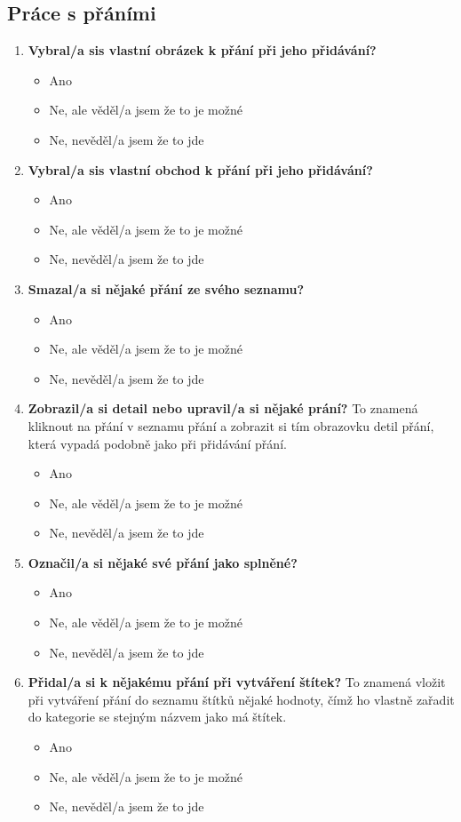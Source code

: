 \subsection{Práce s přáními}
\begin{enumerate}
\item \textbf{Vybral/a sis vlastní obrázek k přání při jeho přidávání?}
		\begin{itemize}
		\item Ano
		\item Ne, ale věděl/a jsem že to je možné
		\item Ne, nevěděl/a jsem že to jde
		\end{itemize}
\item \textbf{Vybral/a sis vlastní obchod k přání při jeho přidávání?}
		\begin{itemize}
		\item Ano
		\item Ne, ale věděl/a jsem že to je možné
		\item Ne, nevěděl/a jsem že to jde
		\end{itemize}
\item \textbf{Smazal/a si nějaké přání ze svého seznamu?}
		\begin{itemize}
		\item Ano
		\item Ne, ale věděl/a jsem že to je možné
		\item Ne, nevěděl/a jsem že to jde
		\end{itemize}
\item \textbf{Zobrazil/a si detail nebo upravil/a si nějaké prání?} To znamená kliknout na přání v seznamu přání a zobrazit si tím obrazovku detil přání, která vypadá podobně jako při přidávání přání.
		\begin{itemize}
		\item Ano
		\item Ne, ale věděl/a jsem že to je možné
		\item Ne, nevěděl/a jsem že to jde
		\end{itemize}
\item \textbf{Označil/a si nějaké své přání jako splněné?}
		\begin{itemize}
		\item Ano
		\item Ne, ale věděl/a jsem že to je možné
		\item Ne, nevěděl/a jsem že to jde
		\end{itemize}
\item \textbf{Přidal/a si k nějakému přání při vytváření štítek?} To znamená vložit při vytváření přání do seznamu štítků nějaké hodnoty, čímž ho vlastně zařadit do kategorie se stejným názvem jako má štítek.
		\begin{itemize}
		\item Ano
		\item Ne, ale věděl/a jsem že to je možné
		\item Ne, nevěděl/a jsem že to jde
		\end{itemize}
\end{enumerate}

